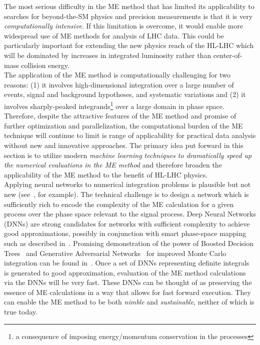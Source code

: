 The most serious difficulty in the ME method that has limited its applicability to searches for beyond-the-SM physics and precision measurements is that it is very \emph{computationally intensive}. If this limitation is overcome, it would enable more widespread use of ME methods for analysis of LHC data. This could be particularly important for extending the new physics reach of the HL-LHC which will be dominated by increases in integrated luminosity rather than center-of-mass collision energy.\\

The application of the ME method %
is computationally challenging for two reasons: (1) it involves high-dimensional integration over a large number of events, signal and background hypotheses, and systematic variations and (2) it involves sharply-peaked integrands\footnote{a consequence of imposing energy/momentum conservation in the processes} over a large domain in phase space. Therefore,
despite the attractive features of the ME method and promise of further optimization and parallelization, the computational burden of the ME technique will continue to limit is range of applicability for practical data analysis without new and innovative approaches. The primary idea put forward in this section is to utilize modern \emph{machine learning techniques to dramatically speed up the numerical evaluations in the ME method} and therefore broaden the applicability of the ME method to the benefit of HL-LHC physics.\\

Applying neural networks to numerical integration problems is plausible but not new (see~\cite{CSEarticle2006,TICNC4344207,IJMC2013}, for example). The technical challenge is to design a network which is sufficiently rich to encode the complexity of the ME calculation for a given process over the phase space relevant to the signal process. Deep Neural Networks (DNNs) are strong candidates for networks with sufficient complexity to achieve good approximations, possibly in conjunction with smart phase-space mapping such as described in~\cite{Artoisenet:2010cn}. Promising demonstration of the power of Boosted Decision Trees~\cite{friedman2000,friedman2001} and Generative Adversarial Networks~\cite{GAN2014arXiv1406.2661G} for improved Monte Carlo integration can be found in~\cite{Bendavid:2017zhk}. Once a set of DNNs representing definite integrals is generated to good approximation, evaluation of the ME method calculations via the DNNs will be very fast. These DNNs can be thought of as preserving the essence of ME calculations in a way that allows for fast forward execution. They can enable the ME method to be both \emph{nimble} and \emph{sustainable}, neither of which is true today.\\

